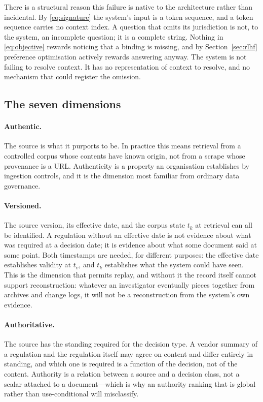 There is a structural reason this failure is native to the architecture rather than
incidental. By \eqref{eq:signature} the system's input is a token sequence, and a
token sequence carries no context index. A question that omits its jurisdiction is
not, to the system, an incomplete question; it is a complete string. Nothing in
\eqref{eq:objective} rewards noticing that a binding is missing, and by
Section~\ref{sec:rlhf} preference optimisation actively rewards answering anyway.
The system is not failing to resolve context. It has no representation of context
to resolve, and no mechanism that could register the omission.

\subsection{The seven dimensions}
\label{sec:six-dimensions}

\paragraph{Authentic.} The source is what it purports to be. In practice this means
retrieval from a controlled corpus whose contents have known origin, not from a
scrape whose provenance is a URL. Authenticity is a property an organisation
establishes by ingestion controls, and it is the dimension most familiar from
ordinary data governance.

\paragraph{Versioned.} The source version, its effective date, and the corpus state
$t_k$ at retrieval can all be identified. A regulation without an effective date is
not evidence about what was required at a decision date; it is evidence about what
some document said at some point. Both timestamps are needed, for different purposes:
the effective date establishes validity at $t_v$, and $t_k$ establishes what the
system could have seen. This is the dimension that permits replay, and without it the record itself cannot
support reconstruction: whatever an investigator eventually pieces together from
archives and change logs, it will not be a reconstruction from the system's own
evidence.

\paragraph{Authoritative.} The source has the standing required for the decision
type. A vendor summary of a regulation and the regulation itself may agree on
content and differ entirely in standing, and which one is required is a function of
the decision, not of the content. Authority is a relation between a source and a
decision class, not a scalar attached to a document---which is why an authority
ranking that is global rather than use-conditional will misclassify.

